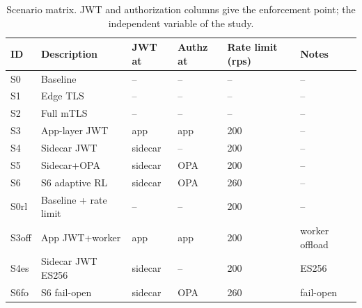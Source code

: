 \begin{table}[t]
\centering
\caption{Scenario matrix. JWT and authorization columns give the enforcement point; the independent variable of the study.}
\label{tab:scenarios}
\small
\begin{tabular}{llllll}
\toprule
ID & Description & JWT at & Authz at & Rate limit (rps) & Notes \\
\midrule
S0 & Baseline & -- & -- & -- & -- \\
S1 & Edge TLS & -- & -- & -- & -- \\
S2 & Full mTLS & -- & -- & -- & -- \\
S3 & App-layer JWT & app & app & 200 & -- \\
S4 & Sidecar JWT & sidecar & -- & 200 & -- \\
S5 & Sidecar+OPA & sidecar & OPA & 200 & -- \\
S6 & S6 adaptive RL & sidecar & OPA & 260 & -- \\
S0rl & Baseline + rate limit & -- & -- & 200 & -- \\
S3off & App JWT+worker & app & app & 200 & worker offload \\
S4es & Sidecar JWT ES256 & sidecar & -- & 200 & ES256 \\
S6fo & S6 fail-open & sidecar & OPA & 260 & fail-open \\
\bottomrule
\end{tabular}
\end{table}
